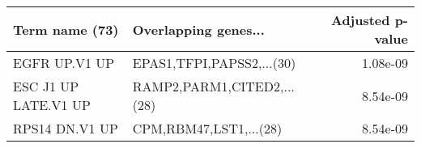 \begin{tabular}{llr}
\toprule
      Term name (73) &       Overlapping genes... &  Adjusted p-value \\
\midrule
       EGFR UP.V1 UP &  EPAS1,TFPI,PAPSS2,...(30) &          1.08e-09 \\
ESC J1 UP LATE.V1 UP & RAMP2,PARM1,CITED2,...(28) &          8.54e-09 \\
      RPS14 DN.V1 UP &     CPM,RBM47,LST1,...(28) &          8.54e-09 \\
\bottomrule
\end{tabular}
